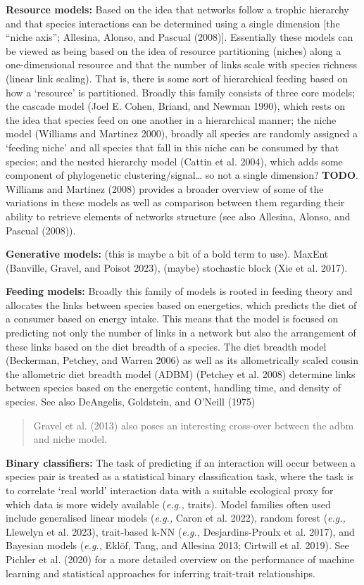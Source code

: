 \documentclass[
  letterpaper,
  DIV=11,
  numbers=noendperiod]{scrartcl}
\begin{document}
\textbf{Resource models:} Based on the idea that networks follow a
trophic hierarchy and that species interactions can be determined using
a single dimension {[}the ``niche axis''; Allesina, Alonso, and Pascual
(2008){]}. Essentially these models can be viewed as being based on the
idea of resource partitioning (niches) along a one-dimensional resource
and that the number of links scale with species richness (linear link
scaling). That is, there is some sort of hierarchical feeding based on
how a `resource' is partitioned. Broadly this family consists of three
core models; the cascade model (Joel E. Cohen, Briand, and Newman 1990),
which rests on the idea that species feed on one another in a
hierarchical manner; the niche model (Williams and Martinez 2000),
broadly all species are randomly assigned a `feeding niche' and all
species that fall in this niche can be consumed by that species; and the
nested hierarchy model (Cattin et al. 2004), which adds some component
of phylogenetic clustering/signal\ldots{} so not a single dimension?
\textbf{TODO}. Williams and Martinez (2008) provides a broader overview
of some of the variations in these models as well as comparison between
them regarding their ability to retrieve elements of networks structure
(see also Allesina, Alonso, and Pascual (2008)).

\textbf{Generative models:} (this is maybe a bit of a bold term to use).
MaxEnt (Banville, Gravel, and Poisot 2023), (maybe) stochastic block
(Xie et al. 2017).

\textbf{Feeding models:} Broadly this family of models is rooted in
feeding theory and allocates the links between species based on
energetics, which predicts the diet of a consumer based on energy
intake. This means that the model is focused on predicting not only the
number of links in a network but also the arrangement of these links
based on the diet breadth of a species. The diet breadth model
(Beckerman, Petchey, and Warren 2006) as well as its allometrically
scaled cousin the allometric diet breadth model (ADBM) (Petchey et al.
2008) determine links between species based on the energetic content,
handling time, and density of species. See also DeAngelis, Goldstein,
and O'Neill (1975)

\begin{quote}
Gravel et al. (2013) also poses an interesting cross-over between the
adbm and niche model.
\end{quote}

\textbf{Binary classifiers:} The task of predicting if an interaction
will occur between a species pair is treated as a statistical binary
classification task, where the task is to correlate `real world'
interaction data with a suitable ecological proxy for which data is more
widely available (\emph{e.g.,} traits). Model families often used
include generalised linear models (\emph{e.g.,} Caron et al. 2022),
random forest (\emph{e.g.,} Llewelyn et al. 2023), trait-based k-NN
(\emph{e.g.,} Desjardins-Proulx et al. 2017), and Bayesian models
(\emph{e.g.,} Eklöf, Tang, and Allesina 2013; Cirtwill et al. 2019). See
Pichler et al. (2020) for a more detailed overview on the performance of
machine learning and statistical approaches for inferring trait-trait
relationships.
\end{document}
